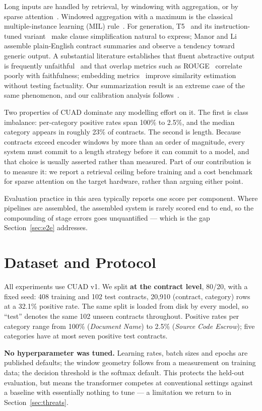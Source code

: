 \documentclass[journal,a4paper]{IEEEtran}
\begin{document}
Long inputs are handled by retrieval, by windowing with aggregation, or by sparse
attention~\cite{longformer}. Windowed aggregation with a maximum is the classical
multiple-instance learning (MIL) rule~\cite{mil}. For generation, T5~\cite{t5} and its
instruction-tuned variant~\cite{flan} make clause simplification natural to express;
Manor and Li~\cite{manor} assemble plain-English contract summaries and observe a tendency
toward generic output. A substantial literature establishes that fluent abstractive output is
frequently unfaithful~\cite{maynez,factcc} and that overlap metrics such as
ROUGE~\cite{rouge} correlate poorly with faithfulness; embedding metrics~\cite{bertscore}
improve similarity estimation without testing factuality. Our summarization result is an
extreme case of the same phenomenon, and our calibration analysis follows~\cite{calibration}.

Two properties of CUAD dominate any modelling effort on it. The first is class imbalance: per-category
positive rates span 100\% to 2.5\%, and the median category appears in roughly 23\% of contracts.
The second is length. Because contracts exceed encoder windows by more than an order of magnitude,
every system must commit to a length strategy before it can commit to a model, and that choice is
usually asserted rather than measured. Part of our contribution is to measure it: we report a
retrieval ceiling before training and a cost benchmark for sparse attention on the target hardware,
rather than arguing either point.

Evaluation practice in this area typically reports one score per component. Where pipelines are
assembled, the assembled system is rarely scored end to end, so the compounding of stage errors goes
unquantified --- which is the gap Section~\ref{sec:e2e} addresses.

\section{Dataset and Protocol}
All experiments use CUAD v1. We split \textbf{at the contract level}, 80/20, with a fixed seed:
408 training and 102 test contracts, 20{,}910 (contract, category) rows at a 32.1\% positive
rate. The same split is loaded from disk by every model, so ``test'' denotes the same 102 unseen
contracts throughout. Positive rates per category range from 100\% (\emph{Document Name}) to
2.5\% (\emph{Source Code Escrow}); five categories have at most seven positive test contracts.

\textbf{No hyperparameter was tuned.} Learning rates, batch sizes and epochs are published
defaults; the window geometry follows from a measurement on training data; the decision
threshold is the softmax default. This protects the held-out evaluation, but means the
transformer competes at conventional settings against a baseline with essentially nothing to
tune --- a limitation we return to in Section~\ref{sec:threats}.
\end{document}
